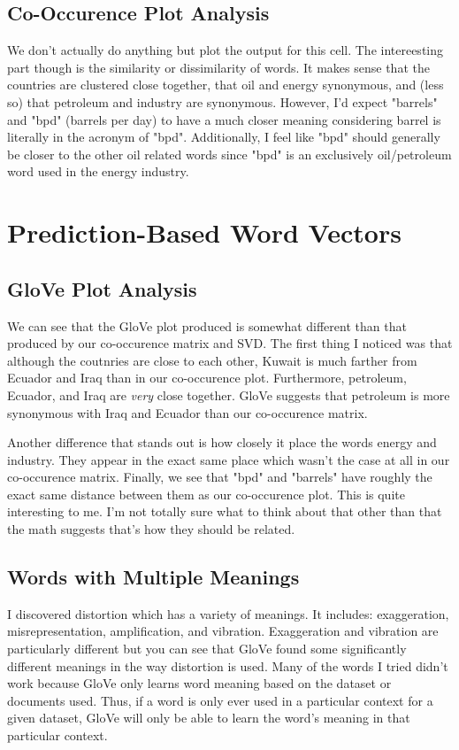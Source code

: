\documentclass[12pt]{article}
\begin{document}
\subsection{Co-Occurence Plot Analysis}
We don't actually do anything but plot the output for this cell. The intereesting part though is 
the similarity or dissimilarity of words. It makes sense that the countries are clustered close 
together, that oil and energy synonymous, and (less so) that petroleum and industry are synonymous. 
However, I'd expect "barrels" and "bpd" (barrels per day) to have a much closer meaning considering
barrel is literally in the acronym of "bpd". Additionally, I feel like "bpd" should generally be 
closer to the other oil related words since "bpd" is an exclusively oil/petroleum word used in the 
energy industry. 

\section{Prediction-Based Word Vectors}

\subsection{GloVe Plot Analysis}
We can see that the GloVe plot produced is somewhat different than that produced by our co-occurence
matrix and SVD. The first thing I noticed was that although the coutnries are close to each other, 
Kuwait is much farther from Ecuador and Iraq than in our co-occurence plot. Furthermore, petroleum, 
Ecuador, and Iraq are \emph{very} close together. GloVe suggests that petroleum is more synonymous 
with Iraq and Ecuador than our co-occurence matrix. 

Another difference that stands out is how closely it place the words energy and industry. They appear 
in the exact same place which wasn't the case at all in our co-occurence matrix. Finally, we see that 
"bpd" and "barrels" have roughly the exact same distance between them as our co-occurence plot. This
is quite interesting to me. I'm not totally sure what to think about that other than that the math 
suggests that's how they should be related. 

\subsection{Words with Multiple Meanings}
I discovered distortion which has a variety of meanings. It includes: exaggeration, misrepresentation, 
amplification, and vibration. Exaggeration and vibration are particularly different but you can see 
that GloVe found some significantly different meanings in the way distortion is used. Many of the words
I tried didn't work because GloVe only learns word meaning based on the dataset or documents used. 
Thus, if a word is only ever used in a particular context for a given dataset, GloVe will only be 
able to learn the word's meaning in that particular context.
\end{document}
